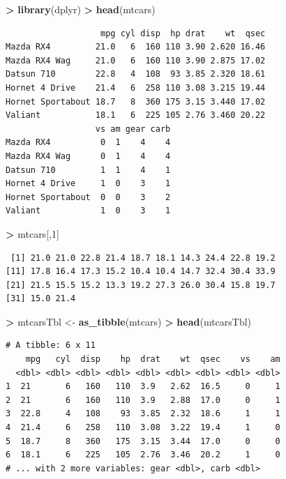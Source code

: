 \documentclass[
]{krantz}
\makeatletter
\newenvironment{Shaded}{\begin{snugshade}}{\end{snugshade}}
\newcommand{\DecValTok}[1]{\textcolor[rgb]{0.06,0.06,0.06}{#1}}
\newcommand{\KeywordTok}[1]{\textcolor[rgb]{0.27,0.27,0.27}{\textbf{#1}}}
\newcommand{\NormalTok}[1]{#1}
\newcommand{\OperatorTok}[1]{\textcolor[rgb]{0.43,0.43,0.43}{\textbf{#1}}}
\newcommand{\StringTok}[1]{\textcolor[rgb]{0.5,0.5,0.5}{#1}}
\newenvironment{kframe}{%
\medskip{}
\setlength{\fboxsep}{.8em}
 \def\at@end@of@kframe{}%
 \ifinner\ifhmode%
  \def\at@end@of@kframe{\end{minipage}}%
  \begin{minipage}{\columnwidth}%
 \fi\fi%
 \def\FrameCommand##1{\hskip\@totalleftmargin \hskip-\fboxsep
 \colorbox{shadecolor}{##1}\hskip-\fboxsep
     \hskip-\linewidth \hskip-\@totalleftmargin \hskip\columnwidth}%
 \MakeFramed {\advance\hsize-\width
   \@totalleftmargin\z@ \linewidth\hsize
   \@setminipage}}%
 {\par\unskip\endMakeFramed%
 \at@end@of@kframe}
\renewenvironment{Shaded}{\begin{kframe}}{\end{kframe}}
\makeatother
\begin{document}
\begin{Shaded}
\begin{Highlighting}[]
\OperatorTok{\textgreater{}}\StringTok{ }\KeywordTok{library}\NormalTok{(dplyr)}
\OperatorTok{\textgreater{}}\StringTok{ }\KeywordTok{head}\NormalTok{(mtcars)}
\end{Highlighting}
\end{Shaded}

\begin{verbatim}
                   mpg cyl disp  hp drat    wt  qsec
Mazda RX4         21.0   6  160 110 3.90 2.620 16.46
Mazda RX4 Wag     21.0   6  160 110 3.90 2.875 17.02
Datsun 710        22.8   4  108  93 3.85 2.320 18.61
Hornet 4 Drive    21.4   6  258 110 3.08 3.215 19.44
Hornet Sportabout 18.7   8  360 175 3.15 3.440 17.02
Valiant           18.1   6  225 105 2.76 3.460 20.22
                  vs am gear carb
Mazda RX4          0  1    4    4
Mazda RX4 Wag      0  1    4    4
Datsun 710         1  1    4    1
Hornet 4 Drive     1  0    3    1
Hornet Sportabout  0  0    3    2
Valiant            1  0    3    1
\end{verbatim}

\begin{Shaded}
\begin{Highlighting}[]
\OperatorTok{\textgreater{}}\StringTok{ }\NormalTok{mtcars[,}\DecValTok{1}\NormalTok{]}
\end{Highlighting}
\end{Shaded}

\begin{verbatim}
 [1] 21.0 21.0 22.8 21.4 18.7 18.1 14.3 24.4 22.8 19.2
[11] 17.8 16.4 17.3 15.2 10.4 10.4 14.7 32.4 30.4 33.9
[21] 21.5 15.5 15.2 13.3 19.2 27.3 26.0 30.4 15.8 19.7
[31] 15.0 21.4
\end{verbatim}

\begin{Shaded}
\begin{Highlighting}[]
\OperatorTok{\textgreater{}}\StringTok{ }\NormalTok{mtcarsTbl \textless{}{-}}\StringTok{ }\KeywordTok{as\_tibble}\NormalTok{(mtcars)}
\OperatorTok{\textgreater{}}\StringTok{ }\KeywordTok{head}\NormalTok{(mtcarsTbl)}
\end{Highlighting}
\end{Shaded}

\begin{verbatim}
# A tibble: 6 x 11
    mpg   cyl  disp    hp  drat    wt  qsec    vs    am
  <dbl> <dbl> <dbl> <dbl> <dbl> <dbl> <dbl> <dbl> <dbl>
1  21       6   160   110  3.9   2.62  16.5     0     1
2  21       6   160   110  3.9   2.88  17.0     0     1
3  22.8     4   108    93  3.85  2.32  18.6     1     1
4  21.4     6   258   110  3.08  3.22  19.4     1     0
5  18.7     8   360   175  3.15  3.44  17.0     0     0
6  18.1     6   225   105  2.76  3.46  20.2     1     0
# ... with 2 more variables: gear <dbl>, carb <dbl>
\end{verbatim}
\end{document}

